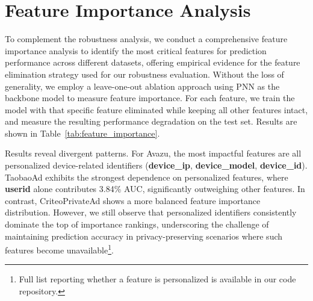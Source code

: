 
\section{Feature Importance Analysis}
\label{sec:feature_importance}
To complement the robustness analysis, we conduct a comprehensive feature importance analysis to identify the most critical features for prediction performance across different datasets, offering empirical evidence for the feature elimination strategy used for our robustness evaluation. Without the loss of generality, we employ a leave-one-out ablation approach using PNN as the backbone model to measure feature importance. For each feature, we train the model with that specific feature eliminated while keeping all other features intact, and measure the resulting performance degradation on the test set. Results are shown in Table~\ref{tab:feature_importance}.

Results reveal divergent patterns. For Avazu, the most impactful features are all personalized device-related identifiers (\textbf{device\_ip}, \textbf{device\_model}, \textbf{device\_id}). TaobaoAd exhibits the strongest dependence on personalized features, where \textbf{userid} alone contributes 3.84\% AUC, significantly outweighing other features. In contrast, CriteoPrivateAd shows a more balanced feature importance distribution. However, we still observe that personalized identifiers consistently dominate the top of importance rankings, underscoring the challenge of maintaining prediction accuracy in privacy-preserving scenarios where such features become unavailable\footnote{Full list reporting whether a feature is personalized is available in our code repository.}.

